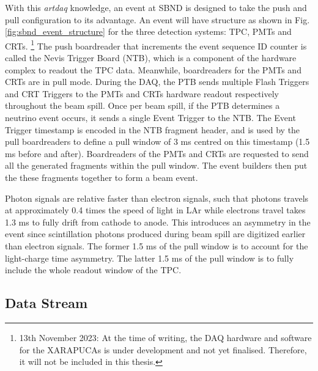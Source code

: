 With this \textit{artdaq} knowledge, an event at SBND is designed to take the push and pull configuration to its advantage.
An event will have structure as shown in Fig. \ref{fig:sbnd_event_structure} for the three detection systems: TPC, PMTs and CRTs.
\footnote{13th November 2023: At the time of writing, the DAQ hardware and software for the XARAPUCAs is under development and not yet finalised. Therefore, it will not be included in this thesis. }
The push boardreader that increments the event sequence ID counter is called the Nevis Trigger Board (NTB), which is a component of the hardware complex to readout the TPC data.
Meanwhile, boardreaders for the PMTs and CRTs are in pull mode.
During the DAQ, the PTB sends multiple Flash Triggers and CRT Triggers to the PMTs and CRTs hardware readout respectively throughout the beam spill.
Once per beam spill, if the PTB determines a neutrino event occurs, it sends a single Event Trigger to the NTB.
The Event Trigger timestamp is encoded in the NTB fragment header, and is used by the pull boardreaders to define a pull window of 3 ms centred on this timestamp (1.5 ms before and after).
Boardreaders of the PMTs and CRTs are requested to send all the generated fragments within the pull window.
The event builders then put the these fragments together to form a beam event.

Photon signals are relative faster than electron signals, such that photons travels at approximately 0.4 times the speed of light in LAr while electrons travel takes 1.3 ms to fully drift from cathode to anode.
This introduces an asymmetry in the event since scintillation photons produced during beam spill are digitized earlier than electron signals.
The former 1.5 ms of the pull window is to account for the light-charge time asymmetry. The latter 1.5 ms of the pull window is to fully include the whole readout window of the TPC.

\subsection{Data Stream}

